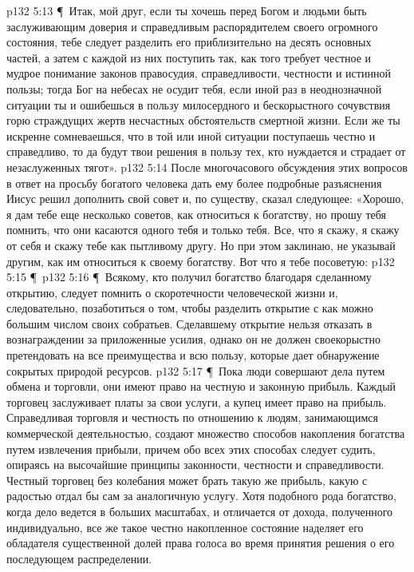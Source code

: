 \vs p132 5:13 \P\ Итак, мой друг, если ты хочешь перед Богом и людьми быть заслуживающим доверия и справедливым распорядителем своего огромного состояния, тебе следует разделить его приблизительно на десять основных частей, а затем с каждой из них поступить так, как того требует честное и мудрое понимание законов правосудия, справедливости, честности и истинной пользы; тогда Бог на небесах не осудит тебя, если иной раз в неоднозначной ситуации ты и ошибешься в пользу милосердного и бескорыстного сочувствия горю страждущих жертв несчастных обстоятельств смертной жизни. Если же ты искренне сомневаешься, что в той или иной ситуации поступаешь честно и справедливо, то да будут твои решения в пользу тех, кто нуждается и страдает от незаслуженных тягот».
\vs p132 5:14 После многочасового обсуждения этих вопросов в ответ на просьбу богатого человека дать ему более подробные разъяснения Иисус решил дополнить свой совет и, по существу, сказал следующее: «Хорошо, я дам тебе еще несколько советов, как относиться к богатству, но прошу тебя помнить, что они касаются одного тебя и только тебя. Все, что я скажу, я скажу от себя и скажу тебе как пытливому другу. Но при этом заклинаю, не указывай другим, как им относиться к своему богатству. Вот что я тебе посоветую:
\vs p132 5:15 \P\ 
\vs p132 5:16 \P\ \bibnobreakspace Всякому, кто получил богатство благодаря сделанному открытию, следует помнить о скоротечности человеческой жизни и, следовательно, позаботиться о том, чтобы разделить открытие с как можно большим числом своих собратьев. Сделавшему открытие нельзя отказать в вознаграждении за приложенные усилия, однако он не должен своекорыстно претендовать на все преимущества и всю пользу, которые дает обнаружение сокрытых природой ресурсов.
\vs p132 5:17 \P\ \ublistelem{3.}\bibnobreakspace Пока люди совершают дела путем обмена и торговли, они имеют право на честную и законную прибыль. Каждый торговец заслуживает платы за свои услуги, а купец имеет право на прибыль. Справедливая торговля и честность по отношению к людям, занимающимся коммерческой деятельностью, создают множество способов накопления богатства путем извлечения прибыли, причем обо всех этих способах следует судить, опираясь на высочайшие принципы законности, честности и справедливости. Честный торговец без колебания может брать такую же прибыль, какую с радостью отдал бы сам за аналогичную услугу. Хотя подобного рода богатство, когда дело ведется в больших масштабах, и отличается от дохода, полученного индивидуально, все же такое честно накопленное состояние наделяет его обладателя существенной долей права голоса во время принятия решения о его последующем распределении.
